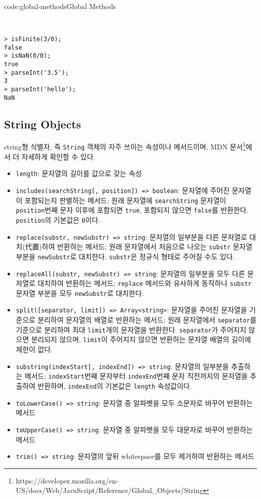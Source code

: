 \begin{codeenv}{code:global-methods}{Global Methods}\begin{verbatim}


> isFinite(3/0);
false
> isNaN(0/0);
true
> parseInt('3.5');
3
> parseInt('hello');
NaN
\end{verbatim}
\end{codeenv}

\subsection*{String Objects}

string형 식별자, 즉 \texttt{String} 객체의 자주 쓰이는 속성이나 메서드이며, MDN 문서\footnote{https://developer.mozilla.org/en-US/docs/Web/JavaScript/Reference/Global\_Objects/String}에서 더 자세하게 확인할 수 있다.

\begin{itemize}
    \item \texttt{length}: 문자열의 길이를 값으로 갖는 속성
    \item \texttt{includes(searchString[, position]) => boolean}: 문자열에 주어진 문자열이 포함되는지 판별하는 메서드; 원래 문자열에 \texttt{searchString} 문자열이 \texttt{position}번째 문자 이후에 포함되면 \texttt{true}, 포함되지 않으면 \texttt{false}를 반환한다. \texttt{position}의 기본값은 \texttt{0}이다.
    \item \texttt{replace(substr, newSubstr) => string}: 문자열의 일부분을 다른 문자열로 대치(代置)하여 반환하는 메서드; 원래 문자열에서 처음으로 나오는 \texttt{substr} 문자열 부분을 \texttt{newSubstr}로 대치한다. \texttt{substr}은 정규식 형태로 주어질 수도 있다.
    \item \texttt{replaceAll(substr, newSubstr) => string}: 문자열의 일부분을 모두 다른 문자열로 대치하여 반환하는 메서드; \texttt{replace} 메서드와 유사하게 동작하나 \texttt{substr} 문자열 부분을 모두 \texttt{newSubstr}로 대치한다.
    \item \texttt{split([separator, limit]) => Array<string>}: 문자열을 주어진 문자열을 기준으로 분리하여 문자열의 배열로 반환하는 메서드; 원래 문자열에서 \texttt{separator}를 기준으로 분리하여 최대 \texttt{limit}개의 문자열을 반환한다. \texttt{separator}가 주어지지 않으면 분리되지 않으며, \texttt{limit}이 주어지지 않으면 반환하는 문자열 배열의 길이에 제한이 없다.
    \item \texttt{substring(indexStart[, indexEnd]) => string}: 문자열의 일부분을 추출하는 메서드; \texttt{indexStart}번째 문자부터 \texttt{indexEnd}번째 문자 직전까지의 문자열을 추출하여 반환하며, \texttt{indexEnd}의 기본값은 \texttt{length} 속성값이다.
    \item \texttt{toLowerCase() => string}: 문자열 중 알파벳을 모두 소문자로 바꾸어 반환하는 메서드
    \item \texttt{toUpperCase() => string}: 문자열 중 알파벳을 모두 대문자로 바꾸어 반환하는 메서드
    \item \texttt{trim() => string}: 문자열의 앞뒤 whitespace를 모두 제거하여 반환하는 메서드
\end{itemize}

